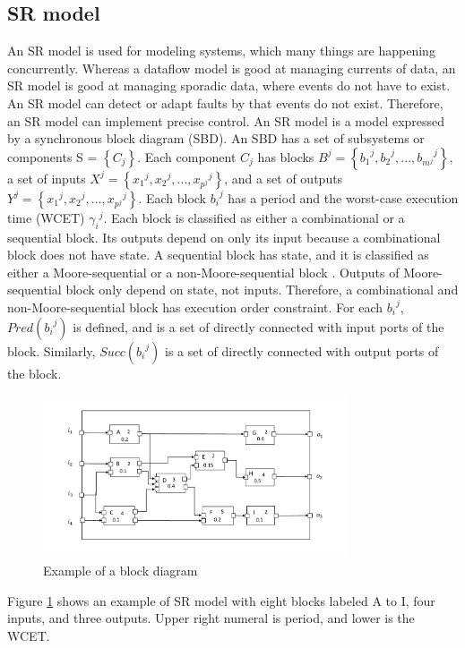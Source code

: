 \documentclass[conference,compsoc]{IEEEtran}
\begin{document}
\subsection{SR model}
An SR model is used for modeling systems, which many things are happening concurrently.
Whereas a dataflow model is good at managing currents of data, an SR model is good at managing sporadic data, where events do not have to exist.
An SR model can detect or adapt faults by that events do not exist.
Therefore, an SR model can implement precise control.
An SR model is a model expressed by a synchronous block diagram (SBD).
An SBD has a set of subsystems or components S = $\left\{C_j\right\}$. 
Each component $C_j$ has blocks $B^j = \left\{{{b_1}^j, {b_2}^j,...,{b_{m^j}}^j}\right\}$, a set of inputs $X^j = \left\{{x_1}^j,{x_2}^j,...,{x_{p^j}}^j\right\}$,
and a set of outputs $Y^j = \left\{{x_1}^j,{x_2}^j,...,{x_{p^j}}^j\right\}$.
Each block ${b_i}^j$ has a period and the worst-case execution time (WCET) ${\gamma_i}^j$.
Each block is classified as either a combinational or a sequential block.
Its outputs depend on only its input because a combinational block does not have state.
A sequential block has state, and it is classified as either a Moore-sequential or a non-Moore-sequential block \cite{Lublinerman:2009:MCG:1480881.1480893}.
Outputs of Moore-sequential block only depend on state, not inputs.
Therefore, a combinational and  non-Moore-sequential block has execution order constraint.
For each ${b_i}^j$, $Pred({b_i}^j)$ is defined, and is a set of directly connected with input ports of the block.
Similarly, $Succ({b_i}^j)$ is a set of directly connected with output ports of the block.
\begin{figure}
	\centering
	\includegraphics[width=9cm,clip]{figure5.pdf}
	\caption{Example of a block diagram}
	\label{fig2}
\end{figure}

Figure \ref{fig2} shows an example of SR model with eight blocks labeled A to I, four inputs, and three outputs.
Upper right numeral is period, and lower is the WCET.
\end{document}
